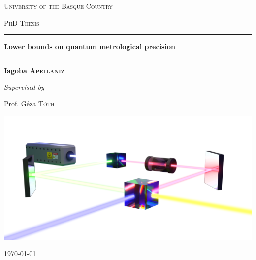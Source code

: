 

\begin{center}

\vspace*{20pt}
\textsc{\LARGE University of the Basque Country}

\vspace{20pt}
\textsc{\Large PhD Thesis}

\vspace{50pt}
\hrule

\vspace{16pt}
{\huge \bfseries Lower bounds on quantum metrological precision}
\vspace{16pt}

\hrule
\vspace{40pt}

\begin{minipage}{0.4\textwidth}
\begin{center}
  \Large
  \textbf{Iagoba \textsc{Apellaniz}}
  \vspace{20pt}

  \large
  \emph{Supervised by}
  \vspace{7pt}

  Prof. G\'eza \textsc{T\'oth}
\end{center}
\end{minipage}

\includegraphics[width=0.8\hsize]{img/0-cover3Dpicture.png}
\vfill

{\large \today}

\end{center}

\cleardoublepage
